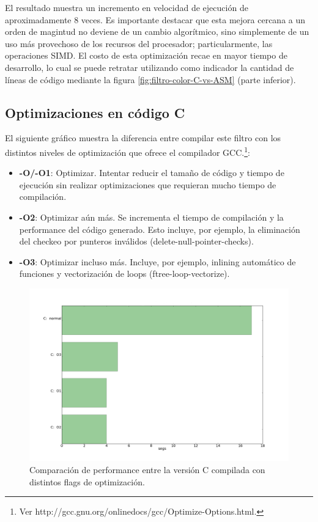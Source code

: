 El resultado muestra un incremento en velocidad de ejecución de aproximadamente 8 veces. Es importante destacar que esta mejora cercana a un orden de magintud no deviene de un cambio algorítmico, sino simplemente de un uso más provechoso de los recursos del procesador; particularmente, las operaciones SIMD. El costo de esta optimización recae en mayor tiempo de desarrollo, lo cual se puede retratar utilizando como indicador la cantidad de líneas de código mediante la figura \ref{fig:filtro-color-C-vs-ASM} (parte inferior).


\subsection{Optimizaciones en código C}
\label{sub:filtro-color-optimizaciones-c}

El siguiente gráfico muestra la diferencia entre compilar este filtro con los distintos niveles de optimización
que ofrece el compilador GCC.\footnote{Ver http://gcc.gnu.org/onlinedocs/gcc/Optimize-Options.html.}:

\begin{itemize}
	\item \textbf{-O/-O1}: Optimizar. Intentar reducir el tamaño de código y tiempo de ejecución sin realizar optimizaciones que requieran mucho tiempo de compilación.
	\item \textbf{-O2}: Optimizar aún más. Se incrementa el tiempo de compilación y la performance del código generado. Esto incluye, por ejemplo, la eliminación del checkeo por punteros inválidos (delete-null-pointer-checks).
	\item \textbf{-O3}: Optimizar incluso más. Incluye, por ejemplo, inlining automático de funciones y vectorización de loops (ftree-loop-vectorize).
\end{itemize}


\begin{figure}[H]
\begin{center}
  \includegraphics[scale=0.35]{secciones/filtro_color/graficos/C_normal_O1_O2_O3.png}
\end{center}
\caption{Comparación de performance entre la versión C compilada con distintos flags de optimización.}
\label{fig:filtro-color-C-vs-Os}
\end{figure}


